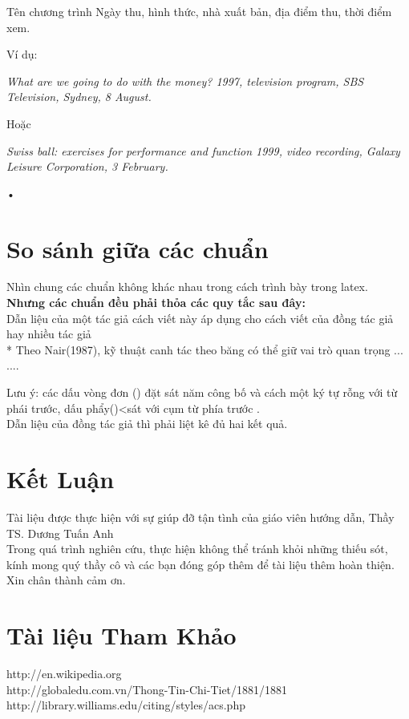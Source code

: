 \documentclass{hcmutarticle}
\begin{document}
Tên chương trình Ngày thu, hình thức, nhà xuất bản, địa điểm thu, thời điểm xem.

Ví dụ:

{\em What are we going to do with the money? 1997, television program, SBS Television, Sydney, 8 August.}

Hoặc

{\em Swiss ball: exercises for performance and function 1999, video recording, Galaxy Leisure Corporation, 3 February.}\begin{scriptsize}
•
\end{scriptsize}

\section{So sánh giữa các chuẩn  }\label{result}
Nhìn chung các chuẩn không khác nhau trong cách trình bày trong latex.\\
{\bfseries Nhưng các chuẩn đều phải thỏa các quy tắc sau đây:}\\
  Dẫn liệu của một tác giả 
 cách viết này áp dụng cho cách viết của đồng tác giả hay nhiều tác giả\\
* Theo Nair(1987), kỹ thuật canh tác theo băng có thể giữ vai trò quan trọng ...\\....


Lưu ý: các dấu vòng đơn () đặt sát năm công bố và cách một ký tự rỗng với từ phái trước, dấu phẩy()<sát với cụm từ phía trước .\\
Dẫn liệu của đồng tác giả
thì phải liệt kê đủ hai kết quả.


\section{Kết Luận }\label{result}
Tài liệu được thực hiện  với sự giúp đỡ tận tình của giáo viên hướng dẫn, Thầy TS. Dương Tuấn Anh\\
Trong quá trình nghiên cứu, thực hiện không thể tránh khỏi những  thiếu sót, kính mong quý thầy  cô và các bạn đóng góp thêm để tài liệu thêm hoàn thiện.\\
Xin chân thành cảm ơn.




\section{Tài liệu Tham Khảo }





http://en.wikipedia.org\\
http://globaledu.com.vn/Thong-Tin-Chi-Tiet/1881/1881\\
http://library.williams.edu/citing/styles/acs.php\\

\end{document}
